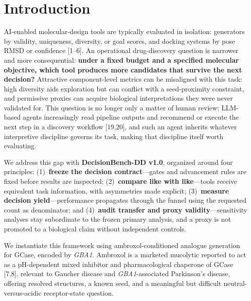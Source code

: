 \documentclass{article}
\begin{document}
\section{Introduction}

AI-enabled molecular-design tools are typically evaluated in isolation: generators by validity, uniqueness, diversity, or goal scores, and docking systems by pose RMSD or confidence [1--6]. An operational drug-discovery question is narrower and more consequential: \textbf{under a fixed budget and a specified molecular objective, which tool produces more candidates that survive the next decision?} Attractive component-level metrics can be misaligned with this task: high diversity aids exploration but can conflict with a seed-proximity constraint, and permissive proxies can acquire biological interpretations they were never validated for. This question is no longer only a matter of human review: LLM-based agents increasingly read pipeline outputs and recommend or execute the next step in a discovery workflow [19,20], and such an agent inherits whatever interpretive discipline governs its task, making that discipline itself worth evaluating.

We address this gap with \textbf{DecisionBench-DD v1.0}, organized around four principles: (1)~\textbf{freeze the decision contract}---gates and advancement rules are fixed before results are inspected; (2)~\textbf{compare like with like}---tools receive equivalent task information, with asymmetries made explicit; (3)~\textbf{measure decision yield}---performance propagates through the funnel using the requested count as denominator; and (4)~\textbf{audit transfer and proxy validity}---sensitivity analyses stay subordinate to the frozen primary analysis, and a proxy is not promoted to a biological claim without independent controls.

We instantiate this framework using ambroxol-conditioned analogue generation for GCase, encoded by \textit{GBA1}. Ambroxol is a marketed mucolytic reported to act as a pH-dependent mixed inhibitor and pharmacological chaperone of GCase [7,8], relevant to Gaucher disease and \textit{GBA1}-associated Parkinson's disease, offering resolved structures, a known seed, and a meaningful but difficult neutral-versus-acidic receptor-state question.
\end{document}
